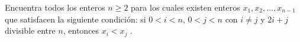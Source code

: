 Encuentra todos los enteros $n \ge 2$ para los cuales existen enteros $x_1, x_2, \dots , x_{n-1}$ que
satisfacen la siguiente condición: si $0 \lt i \lt n$, $0 \lt j \lt n$ con $i \neq j$ y $2i + j $ divisible entre $n$, entonces
$x_i \lt x_j$ .